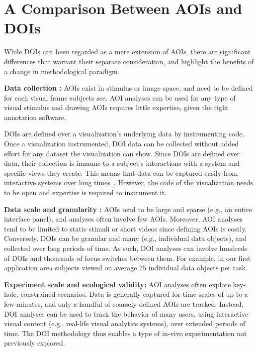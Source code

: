 \section{A Comparison Between AOIs and DOIs}
\label{sec:AOIvsDOI}


While DOIs can been regarded as a mere extension of AOIs, there are significant differences that warrant their separate consideration, and highlight the benefits of a change in methodological paradigm.

\noindent \textbf{Data collection :} AOIs exist in stimulus or image space, and need to be defined for each visual frame subjects see. AOI analyses can be used for any type of visual stimulus and drawing AOIs requires little expertise, given the right annotation software. 

DOIs are defined over a visualization's underlying data by instrumenting code. Once a visualization instrumented, DOI data can be collected without added effort for any dataset the visualization can show. Since DOIs are defined over data, their collection is immune to a subject's interactions with a system and specific views they create. This means that data can be captured easily from interactive systems over long times~\cite{Ala16}. However, the code of the visualization needs to be open and expertise is required to instrument it.

\vspace{2mm}

\noindent \textbf{Data scale and granularity :} AOIs tend to be large and sparse (e.g., an entire interface panel), and analyses often involve few AOIs. Moreover, AOI analyses tend to be limited to static stimuli or short videos since defining AOIs is costly. Conversely, DOIs can be granular and many (e.g., individual data objects), and collected over long periods of time. As such, DOI analyses can involve hundreds of DOIs and thousands of focus switches between them. For example, in our first application area subjects viewed on average $75$ individual data objects per task.

\vspace{2mm}

\noindent \textbf{Experiment scale and ecological validity:} AOI analyses often explore key-hole, constrained scenarios. Data is generally captured for time scales of up to a few minutes, and only a handful of coarsely defined AOIs are tracked. Instead, DOI analyses can be used to track the behavior of many users, using interactive visual content (e.g., real-life visual analytics systems), over extended periods of time. The DOI methodology thus enables a type of in-vivo experimentation not previously explored.

